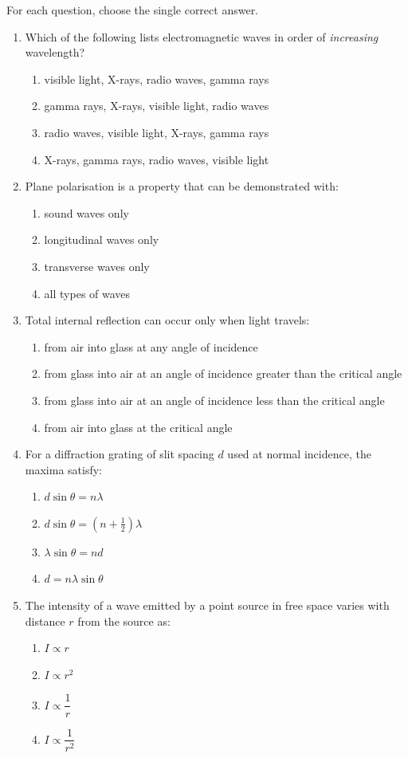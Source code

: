 \documentclass[11pt]{article}
\begin{document}
\begin{exercice}
For each question, choose the single correct answer.
\begin{enumerate}
\item Which of the following lists electromagnetic waves in order of \emph{increasing} wavelength?
\begin{enumerate}
\item visible light, X-rays, radio waves, gamma rays
\item gamma rays, X-rays, visible light, radio waves
\item radio waves, visible light, X-rays, gamma rays
\item X-rays, gamma rays, radio waves, visible light
\end{enumerate}
\item Plane polarisation is a property that can be demonstrated with:
\begin{enumerate}
\item sound waves only
\item longitudinal waves only
\item transverse waves only
\item all types of waves
\end{enumerate}
\item Total internal reflection can occur only when light travels:
\begin{enumerate}
\item from air into glass at any angle of incidence
\item from glass into air at an angle of incidence greater than the critical angle
\item from glass into air at an angle of incidence less than the critical angle
\item from air into glass at the critical angle
\end{enumerate}
\item For a diffraction grating of slit spacing $d$ used at normal incidence, the maxima satisfy:
\begin{enumerate}
\item $d\sin\theta = n\lambda$
\item $d\sin\theta = (n+\tfrac{1}{2})\lambda$
\item $\lambda\sin\theta = nd$
\item $d = n\lambda\sin\theta$
\end{enumerate}
\item The intensity of a wave emitted by a point source in free space varies with distance $r$ from the source as:
\begin{enumerate}
\item $I \propto r$
\item $I \propto r^{2}$
\item $I \propto \dfrac{1}{r}$
\item $I \propto \dfrac{1}{r^{2}}$
\end{enumerate}
\end{enumerate}
\end{exercice}
\end{document}
